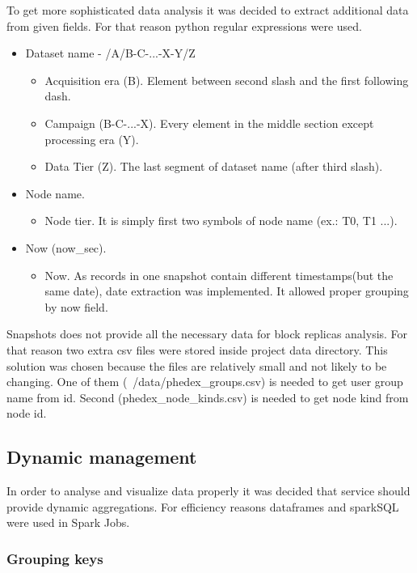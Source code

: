 To get more sophisticated data analysis it was decided to extract additional data from given fields. For that reason python regular expressions were used.
\begin{itemize}
\item Dataset name - /A/B-C-...-X-Y/Z
\begin{itemize}
\item Acquisition era (B). Element between second slash and the first following dash.
\item Campaign (B-C-...-X). Every element in the middle section except processing era (Y).
\item Data Tier (Z). The last segment of dataset name (after third slash). 
\end{itemize}
\item Node name.
\begin{itemize}
\item Node tier. It is simply first two symbols of node name (ex.: T0, T1 ...).
\end{itemize}
\item Now (now{\_}sec).
\begin{itemize}
\item Now. As records in one snapshot contain different timestamps(but the same date), date extraction was implemented. It allowed proper grouping by now field.
\end{itemize}
\end{itemize}
Snapshots does not provide all the necessary data for block replicas analysis. For that reason two extra csv files were stored inside project data directory. 
This solution was chosen because the files are relatively small and not likely to be changing. One of them (~/data/phedex{\_}groups.csv) is needed to get user 
group name from id. Second (phedex{\_}node{\_}kinds.csv) is needed to get node kind from node id.

\subsection{Dynamic management}

In order to analyse and visualize data properly it was decided that service should provide dynamic aggregations. For efficiency reasons dataframes and sparkSQL 
were used in Spark Jobs.

\subsubsection{Grouping keys}

